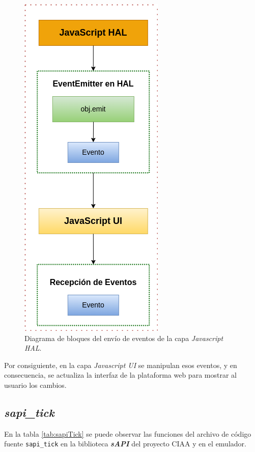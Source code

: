 \begin{figure}[ht]
	\centering
	\includegraphics[scale=.40]{./Figures/gpioEmit.png}
	\caption{Diagrama de bloques del envío de eventos de la capa \textit{Javascript HAL}.}
	\label{fig:gpioEmit}
\end{figure}

Por consiguiente, en la capa \textit{Javascript UI} se manipulan esos eventos, y en consecuencia, se actualiza la interfaz de la plataforma web para mostrar al usuario los cambios.

\subsection{\textit{\textbf{sapi\_tick}}}
\label{sec:sapi_tick}

En la tabla \ref{tab:sapiTick} se puede observar las funciones del archivo de código fuente \texttt{sapi\_tick} en la biblioteca \textit{\textbf{sAPI}} del proyecto CIAA y en el emulador.

